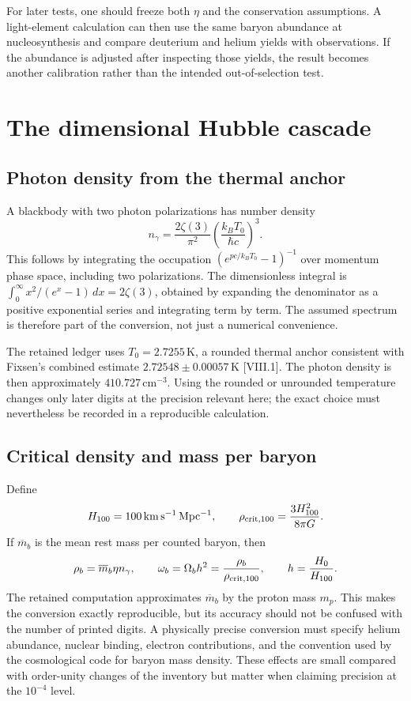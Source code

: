 For later tests, one should freeze both $\eta$ and the conservation assumptions. A light-element calculation can then use the same baryon abundance at nucleosynthesis and compare deuterium and helium yields with observations. If the abundance is adjusted after inspecting those yields, the result becomes another calibration rather than the intended out-of-selection test.

\section{The dimensional Hubble cascade}
\subsection{Photon density from the thermal anchor}
A blackbody with two photon polarizations has number density
\begin{equation}
 n_\gamma=\frac{2\zeta(3)}{\pi^2}
 \left(\frac{k_BT_0}{\hbar c}\right)^3.
 \label{c8:photons}
\end{equation}
This follows by integrating the occupation $(e^{pc/k_BT_0}-1)^{-1}$ over momentum phase space, including two polarizations. The dimensionless integral is $\int_0^\infty x^2/(e^x-1)\,dx=2\zeta(3)$, obtained by expanding the denominator as a positive exponential series and integrating term by term. The assumed spectrum is therefore part of the conversion, not just a numerical convenience.

The retained ledger uses $T_0=2.7255\,\mathrm K$, a rounded thermal anchor consistent with Fixsen's combined estimate $2.72548\pm0.00057\,\mathrm K$ [VIII.1]. The photon density is then approximately $410.727\,\mathrm{cm^{-3}}$. Using the rounded or unrounded temperature changes only later digits at the precision relevant here; the exact choice must nevertheless be recorded in a reproducible calculation.

\subsection{Critical density and mass per baryon}
Define
\begin{equation}
 H_{100}=100\,\mathrm{km\,s^{-1}\,Mpc^{-1}},\qquad
 \rho_{\rm crit,100}=\frac{3H_{100}^2}{8\pi G}.
 \label{c8:critical}
\end{equation}
If $\overline m_b$ is the mean rest mass per counted baryon, then
\begin{equation}
 \rho_b=\overline m_b\eta n_\gamma,\qquad
 \omega_b=\Omega_bh^2=\frac{\rho_b}{\rho_{\rm crit,100}},
 \qquad h=\frac{H_0}{H_{100}}.
 \label{c8:physicalbaryon}
\end{equation}
The retained computation approximates $\overline m_b$ by the proton mass $m_p$. This makes the conversion exactly reproducible, but its accuracy should not be confused with the number of printed digits. A physically precise conversion must specify helium abundance, nuclear binding, electron contributions, and the convention used by the cosmological code for baryon mass density. These effects are small compared with order-unity changes of the inventory but matter when claiming precision at the $10^{-4}$ level.

